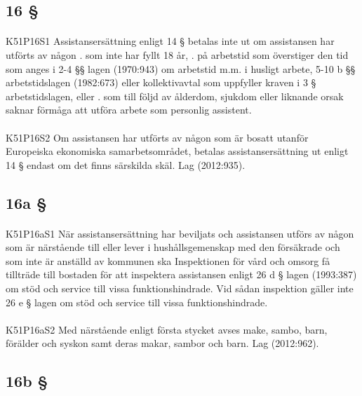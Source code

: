 \documentclass[a4paper,notitlepage,openany,10pt]{book}
\begin{document}
\subsection*{16 §}
\paragraph*{}
{\tiny K51P16S1}
Assistansersättning enligt 14 § betalas inte ut om assistansen har utförts av någon
. som inte har fyllt 18 år,
. på arbetstid som överstiger den tid som anges i 2-4 §§ lagen (1970:943) om arbetstid m.m. i husligt arbete, 5-10 b §§ arbetstidslagen (1982:673) eller kollektivavtal som uppfyller kraven i 3 § arbetstidslagen, eller
. som till följd av ålderdom, sjukdom eller liknande orsak saknar förmåga att utföra arbete som personlig assistent.
\paragraph*{}
{\tiny K51P16S2}
Om assistansen har utförts av någon som är bosatt utanför Europeiska ekonomiska samarbetsområdet, betalas assistansersättning ut enligt 14 § endast om det finns särskilda skäl.
Lag (2012:935).
\subsection*{16a §}
\paragraph*{}
{\tiny K51P16aS1}
När assistansersättning har beviljats och assistansen utförs av någon som är närstående till eller lever i hushållsgemenskap med den försäkrade och som inte är anställd av kommunen ska Inspektionen för vård och omsorg få tillträde till bostaden för att inspektera assistansen enligt 26 d § lagen (1993:387) om stöd och service till vissa funktionshindrade. Vid sådan inspektion gäller inte 26 e § lagen om stöd och service till vissa funktionshindrade.
\paragraph*{}
{\tiny K51P16aS2}
Med närstående enligt första stycket avses make, sambo, barn, förälder och syskon samt deras makar, sambor och barn.
Lag (2012:962).
\subsection*{16b §}
\end{document}
